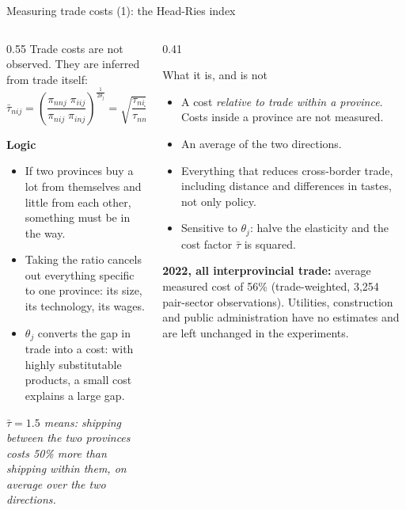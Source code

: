 \documentclass[aspectratio=169,9pt,t]{beamer}
\newcommand{\plain}[1]{{\color{ipgrey}\small\itshape #1}}
\begin{document}
\begin{frame}{Measuring trade costs (1): the Head-Ries index}
  \begin{columns}[T]
    \begin{column}{0.55\textwidth}
      Trade costs are not observed. They are inferred from trade
      itself:
      \[ \bar\tau_{nij}=\left(\frac{\pi_{nnj}\;\pi_{iij}}{\pi_{nij}\;\pi_{inj}}\right)^{\frac{1}{2\theta_j}}
         =\sqrt{\frac{\tau_{nij}\,\tau_{inj}}{\tau_{nnj}\,\tau_{iij}}} \]

      \textbf{Logic}
      \begin{itemize}
        \item If two provinces buy a lot from themselves and little from
              each other, something must be in the way.
        \item Taking the ratio cancels out everything specific to one
              province: its size, its technology, its wages.
        \item $\theta_j$ converts the gap in trade into a cost: with
              highly substitutable products, a small cost explains a
              large gap.
      \end{itemize}
      \plain{$\bar\tau=1.5$ means: shipping between the two provinces
      costs 50\% more than shipping within them, on average over the two
      directions.}
    \end{column}
    \begin{column}{0.41\textwidth}
      \begin{block}{What it is, and is not}
        \small
        \begin{itemize}
          \item A cost \emph{relative to trade within a province}. Costs
                inside a province are not measured.
          \item An average of the two directions.
          \item Everything that reduces cross-border trade, including
                distance and differences in tastes, not only policy.
          \item Sensitive to $\theta_j$: halve the elasticity and the
                cost factor $\bar\tau$ is squared.
        \end{itemize}
      \end{block}
      \small
      \textbf{2022, all interprovincial trade:} average measured cost of
      \alert{56\%} (trade-weighted, 3,254 pair-sector observations).
      Utilities, construction and public administration have no
      estimates and are left unchanged in the experiments.
    \end{column}
  \end{columns}
\end{frame}
\end{document}
